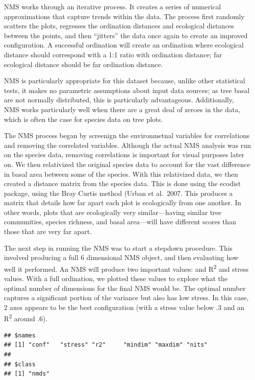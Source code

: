 \documentclass[
  12pt,
]{article}
\begin{document}
NMS works through an iterative process. It creates a series of numerical
approximations that capture trends within the data. The process first
randomly scatters the plots, regresses the ordination distances and
ecological distances between the points, and then ``jitters'' the data
once again to create an improved configuration. A successful ordination
will create an ordination where ecological distance should correspond
with a 1:1 ratio with ordination distance; far ecological distance
should be far ordination distance.

NMS is particularly appropriate for this dataset because, unlike other
statistical tests, it makes no parametric assumptions about input data
sources; as tree basal are not normally distributed, this is
particularly advantageous. Additionally, NMS works particularly well
when there are a great deal of zeroes in the data, which is often the
case for species data on tree plots.

The NMS process began by screenign the environmetnal variables for
correlations and removing the correlated variables. Although the actual
NMS analysis was run on the species data, removing correlations is
important for visual purposes later on. We then relativized the original
species data to account for the vast difference in basal area between
some of the species. With this relativized data, we then created a
distance matrix from the species data. This is done using the ecodist
package, using the Bray Curtis method (Urban et al.~2007. This produces
a matrix that details how far apart each plot is ecologically from one
another. In other words, plots that are ecologically very
similar---having similar tree communities, species richness, and basal
area---will have different scores than those that are very far apart.

The next step in running the NMS was to start a stepdown procedure. This
involved producing a full 6 dimensional NMS object, and then evaluating
how well it performed. An NMS will produce two important values: and
R\textsuperscript{2} and stress values. With a full ordination, we
plotted these values to explore what the optimal number of dimensions
for the final NMS would be. The optimal number captures a significant
portion of the variance but also has low stress. In this case, 2 axes
appears to be the best configuration (with a stress value below .3 and
an R\textsuperscript{2} around .6).

\begin{verbatim}
## $names
## [1] "conf"   "stress" "r2"     "mindim" "maxdim" "nits"  
## 
## $class
## [1] "nmds"
\end{verbatim}
\end{document}
